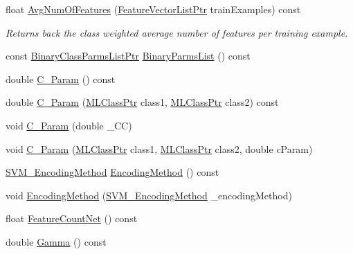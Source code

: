 \begin{DoxyCompactItemize}
\item 
float \hyperlink{class_k_k_m_l_l_1_1_s_v_mparam_aea20e2e912e4ef0aebcd2da8f127c32a}{Avg\+Num\+Of\+Features} (\hyperlink{namespace_k_k_m_l_l_acf2ba92a3cf03e2b19674b24ff488ef6}{Feature\+Vector\+List\+Ptr} train\+Examples) const 
\begin{DoxyCompactList}\small\item\em Returns back the class weighted average number of features per training example. \end{DoxyCompactList}\item 
const \hyperlink{namespace_k_k_m_l_l_a15376316ebec0ec5e4d1f11cfb06c15b}{Binary\+Class\+Parms\+List\+Ptr} \hyperlink{class_k_k_m_l_l_1_1_s_v_mparam_a433e645fd36fbf86a92dff43f4d2c812}{Binary\+Parms\+List} () const 
\item 
double \hyperlink{class_k_k_m_l_l_1_1_s_v_mparam_ae370b8852451329cd5548b790ab5d65a}{C\+\_\+\+Param} () const 
\item 
double \hyperlink{class_k_k_m_l_l_1_1_s_v_mparam_aa447494cc004d960e4e7087ff95b0bcb}{C\+\_\+\+Param} (\hyperlink{namespace_k_k_m_l_l_ac272393853d59e72e8456f14cd6d8c23}{M\+L\+Class\+Ptr} class1, \hyperlink{namespace_k_k_m_l_l_ac272393853d59e72e8456f14cd6d8c23}{M\+L\+Class\+Ptr} class2) const 
\item 
void \hyperlink{class_k_k_m_l_l_1_1_s_v_mparam_aa2f055aaa47a5ae839aee315e67c97dc}{C\+\_\+\+Param} (double \+\_\+\+CC)
\item 
void \hyperlink{class_k_k_m_l_l_1_1_s_v_mparam_a3826910d5c5f40a2d3d85f5f83d670ce}{C\+\_\+\+Param} (\hyperlink{namespace_k_k_m_l_l_ac272393853d59e72e8456f14cd6d8c23}{M\+L\+Class\+Ptr} class1, \hyperlink{namespace_k_k_m_l_l_ac272393853d59e72e8456f14cd6d8c23}{M\+L\+Class\+Ptr} class2, double c\+Param)
\item 
\hyperlink{namespace_k_k_m_l_l_a1994af1d94ca5bf6e27f0cf803a8d64c}{S\+V\+M\+\_\+\+Encoding\+Method} \hyperlink{class_k_k_m_l_l_1_1_s_v_mparam_a64c242e8dc965631a3f3a95de555cd40}{Encoding\+Method} () const 
\item 
void \hyperlink{class_k_k_m_l_l_1_1_s_v_mparam_a0a547718ae424aa1958b255a174ffd71}{Encoding\+Method} (\hyperlink{namespace_k_k_m_l_l_a1994af1d94ca5bf6e27f0cf803a8d64c}{S\+V\+M\+\_\+\+Encoding\+Method} \+\_\+encoding\+Method)
\item 
float \hyperlink{class_k_k_m_l_l_1_1_s_v_mparam_a1531d88ea94ba6cb7296c566e8d23268}{Feature\+Count\+Net} () const 
\item 
double \hyperlink{class_k_k_m_l_l_1_1_s_v_mparam_a1020e8f3be4aab8ca18971164aa28394}{Gamma} () const 

\end{DoxyCompactItemize}
